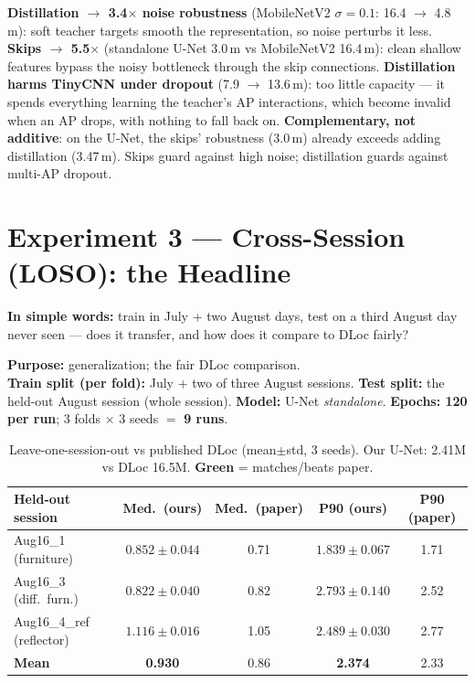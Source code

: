 \documentclass[11pt]{article}
\newcommand{\best}[1]{\textbf{\textcolor{green!50!black}{#1}}}
\begin{document}
\begin{whybox}
\textbf{Distillation $\to$ 3.4$\times$ noise robustness} (MobileNetV2 $\sigma{=}0.1$: 16.4 $\to$ 4.8\,m):
soft teacher targets smooth the representation, so noise perturbs it less. \quad
\textbf{Skips $\to$ 5.5$\times$} (standalone U-Net 3.0\,m vs MobileNetV2 16.4\,m): clean shallow features
bypass the noisy bottleneck through the skip connections. \quad \textbf{Distillation harms TinyCNN under
dropout} (7.9 $\to$ 13.6\,m): too little capacity --- it spends everything learning the teacher's AP
interactions, which become invalid when an AP drops, with nothing to fall back on. \quad
\textbf{Complementary, not additive}: on the U-Net, the skips' robustness (3.0\,m) already exceeds adding
distillation (3.47\,m). Skips guard against high noise; distillation guards against multi-AP dropout.
\end{whybox}

\section{Experiment 3 --- Cross-Session (LOSO): the Headline}

\textbf{In simple words:} train in July + two August days, test on a third August day never seen --- does
it transfer, and how does it compare to DLoc fairly?

\textbf{Purpose:} generalization; the fair DLoc comparison.\\
\textbf{Train split (per fold):} July + two of three August sessions. \quad \textbf{Test split:} the
held-out August session (whole session). \quad \textbf{Model:} U-Net \emph{standalone}. \quad
\textbf{Epochs: 120 per run}; 3 folds $\times$ 3 seeds $=$ \textbf{9 runs}.

\begin{table}[h]\centering\footnotesize
\caption{Leave-one-session-out vs published DLoc (mean$\pm$std, 3 seeds). Our U-Net: 2.41M vs DLoc 16.5M.
\best{Green} = matches/beats paper.}
\begin{tabular}{@{}lcccc@{}}
\toprule
\textbf{Held-out session} & \textbf{Med.\ (ours)} & \textbf{Med.\ (paper)} & \textbf{P90 (ours)} & \textbf{P90 (paper)} \\
\midrule
Aug16\_1 (furniture)      & $0.852\pm0.044$ & 0.71 & $1.839\pm0.067$ & 1.71 \\
Aug16\_3 (diff.\ furn.)   & \best{$0.822\pm0.040$} & 0.82 & $2.793\pm0.140$ & 2.52 \\
Aug16\_4\_ref (reflector) & $1.116\pm0.016$ & 1.05 & \best{$2.489\pm0.030$} & 2.77 \\
\midrule
\textbf{Mean}             & \textbf{0.930} & 0.86 & \textbf{2.374} & 2.33 \\
\bottomrule
\end{tabular}
\end{table}
\end{document}
